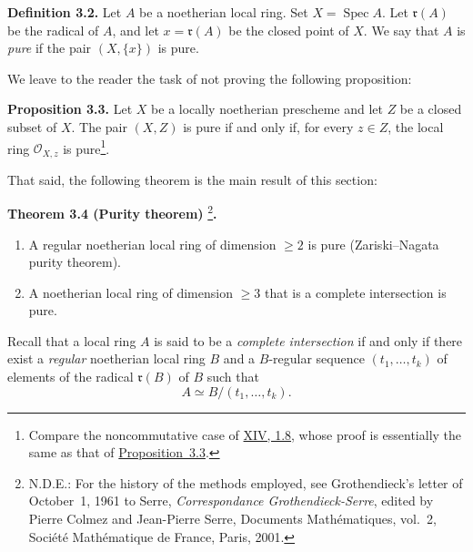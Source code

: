 \documentclass[11pt,a4paper,oneside]{book}
\providecommand{\Oo}{\mathcal O}
\providecommand{\ideal}[1]{\mathfrak{#1}}
\providecommand{\rr}{\ideal r}
\providecommand{\Spec}{\operatorname{Spec}}
\theoremstyle{plain}
\theoremstyle{definition}
\theoremstyle{remark}
\begin{document}
\medskip
{}\noindent\textbf{Definition 3.2.}\quad
Let $A$ be a noetherian local ring. Set $X=\Spec A$. Let $\rr(A)$ be the
radical of $A$, and let $x=\rr(A)$ be the closed point of $X$. We say that
$A$ is \emph{pure} if the pair $(X,\{x\})$ is pure.

\medskip
\noindent We leave to the reader the task of not proving the following
proposition:

\medskip
{}\noindent\textbf{Proposition 3.3.}\quad
Let $X$ be a locally noetherian prescheme and let $Z$ be a closed subset of
$X$. The pair $(X,Z)$ is pure if and only if, for every $z\in Z$, the local
ring $\Oo_{X,z}$ is pure\renewcommand{\thefootnote}{**}\footnote{Compare the
noncommutative case of \hyperref[XIV.1.8]{XIV, 1.8}, whose proof is essentially the same as that
of \hyperref[X.3.3]{Proposition~3.3}.}.

\medskip
{}

\medskip
\noindent That said, the following theorem is the main result of this
section:

\medskip
{}\noindent\textbf{Theorem 3.4 (Purity theorem)}%
\renewcommand{\thefootnote}{(4)}\footnote{\textsc{N.D.E.}: For the history of
the methods employed, see Grothendieck's letter of October~1, 1961 to Serre,
\emph{Correspondance Grothendieck-Serre}, edited by Pierre Colmez and
Jean-Pierre Serre, Documents Math\'ematiques, vol.~2, Soci\'et\'e
Math\'ematique de France, Paris, 2001.}\textbf{.}

\begin{enumerate}
  \renewcommand{\labelenumi}{(\roman{enumi})}
  \item A regular noetherian local ring of dimension $\geq 2$ is pure
  (Zariski--Nagata purity theorem).
  \item A noetherian local ring of dimension $\geq 3$ that is a complete
  intersection is pure.
\end{enumerate}

\medskip
\noindent Recall that a local ring $A$ is said to be a \emph{complete
intersection} if and only if there exist a \emph{regular} noetherian local
ring $B$ and a $B$-regular sequence $(t_1,\ldots,t_k)$ of elements of the
radical $\mathfrak r(B)$ of $B$ such that
\[
  A \simeq B/(t_1,\ldots,t_k).
\]
\end{document}
